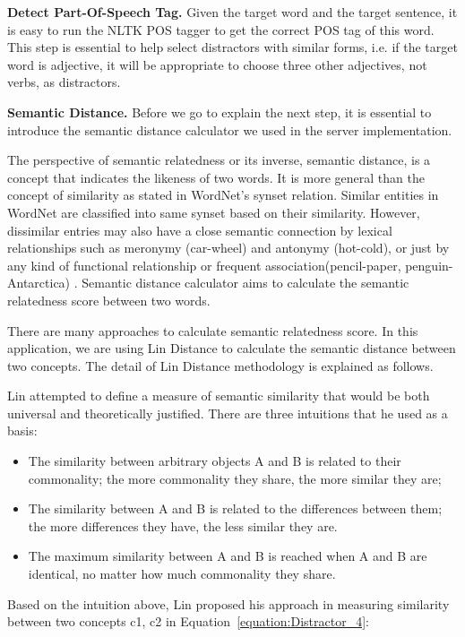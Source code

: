 {\bf Detect Part-Of-Speech Tag.}
Given the target word and the target sentence, it is easy to run the NLTK POS tagger to get the correct POS tag of this word. This step is essential to help select distractors with similar forms, i.e. if the target word is adjective, it will be appropriate to choose three other adjectives, not verbs, as distractors.

{\bf Semantic Distance.}
Before we go to explain the next step, it is essential to introduce the semantic distance calculator we used in the server implementation. 

The perspective of semantic relatedness or its inverse, semantic distance, is a concept that indicates the likeness of two words. It is more general than the concept of similarity as stated in WordNet’s synset relation. Similar entities in WordNet are classified into same synset based on their similarity. However, dissimilar entries may also have a close semantic connection by lexical relationships  such as meronymy (car-wheel) and antonymy (hot-cold), or just by any kind of functional relationship or frequent association(pencil-paper, penguin-Antarctica) \cite{ale01}. Semantic distance calculator aims to calculate the semantic relatedness score between two words.

There are many approaches to calculate semantic relatedness score. In this application, we are using Lin Distance \cite{lin98} to calculate the semantic distance between two concepts. The detail of Lin Distance methodology is explained as follows.

Lin attempted to define a measure of semantic similarity that would be both universal and theoretically justified. There are three intuitions that he used as a basis:
\begin{itemize}
\item The similarity between arbitrary objects A and B is related to their commonality; the more commonality they share, the more similar they are;
\item The similarity between A and B is related to the differences between them; the more differences they have, the less similar they are.
\item The maximum similarity between A and B is reached when A and B are identical, no matter how much commonality they share. 
\end{itemize}

Based on the intuition above, Lin proposed his approach in measuring similarity between two concepts c1, c2 in Equation~\ref{equation:Distractor_4}:

